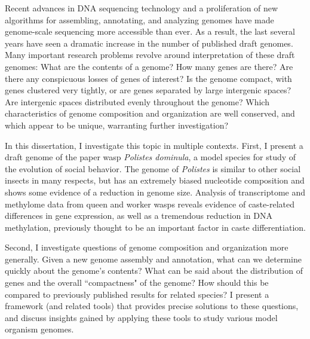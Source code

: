 
Recent advances in DNA sequencing technology and a proliferation of new algorithms for assembling, annotating, and analyzing genomes have made genome-scale sequencing more accessible than ever.
As a result, the last several years have seen a dramatic increase in the number of published draft genomes.
Many important research problems revolve around interpretation of these draft genomes:
What are the contents of a genome?
How many genes are there?
Are there any conspicuous losses of genes of interest?
Is the genome compact, with genes clustered very tightly, or are genes separated by large intergenic spaces?
Are intergenic spaces distributed evenly throughout the genome?
Which characteristics of genome composition and organization are well conserved, and which appear to be unique, warranting further investigation?

In this dissertation, I investigate this topic in multiple contexts.
First, I present a draft genome of the paper wasp \textit{Polistes dominula}, a model species for study of the evolution of social behavior.
The genome of \textit{Polistes} is similar to other social insects in many respects, but has an extremely biased nucleotide composition and shows some evidence of a reduction in genome size.
Analysis of transcriptome and methylome data from queen and worker wasps reveals evidence of caste-related differences in gene expression, as well as a tremendous reduction in DNA methylation, previously thought to be an important factor in caste differentiation.

Second, I investigate questions of genome composition and organization more generally.
Given a new genome assembly and annotation, what can we determine quickly about the genome's contents?
What can be said about the distribution of genes and the overall ``compactness" of the genome?
How should this be compared to previously published results for related species?
I present a framework (and related tools) that provides precise solutions to these questions, and discuss insights gained by applying these tools to study various model organism genomes.
